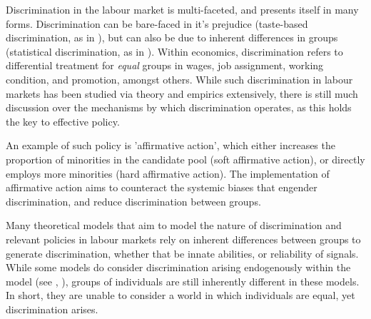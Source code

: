 \documentclass[]{article}
\begin{document}
Discrimination in the labour market is multi-faceted, and presents itself in many forms. Discrimination can be bare-faced in it's prejudice (taste-based discrimination, as in \citet{Becker1957}), but can also be due to inherent differences in groups (statistical discrimination, as in \cite{Arrow1973}). Within economics, discrimination refers to differential treatment for \textit{equal} groups in wages, job assignment, working condition, and promotion, amongst others. While such discrimination in labour markets has been studied via theory and empirics extensively, there is still much discussion over the mechanisms by which discrimination operates, as this holds the key to effective policy.

An example of such policy is 'affirmative action', which either increases the proportion of minorities in the candidate pool (soft affirmative action), or directly employs more minorities (hard affirmative action). The implementation of affirmative action aims to counteract the systemic biases that engender discrimination, and reduce discrimination between groups.

Many theoretical models that aim to model the nature of discrimination and relevant policies in labour markets rely on inherent differences between groups to generate discrimination, whether that be innate abilities, or reliability of signals. While some models do consider discrimination arising endogenously within the model (see \citet{CoatesLoury1993}, \citet{LunderbergStartz1983}), groups of individuals are still inherently different in these models. In short, they are unable to consider a world in which individuals are equal, yet discrimination arises. 
\end{document}
